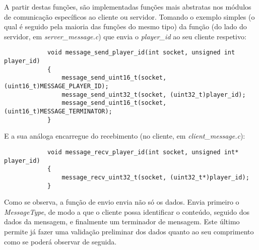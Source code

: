 \documentclass[a4paper]{report}
\begin{document}
        \par A partir destas funções, são implementadas funções mais abstratas nos módulos de comunicação específicos ao cliente ou servidor. Tomando o exemplo simples (o qual é seguido pela maioria das funções do mesmo tipo) da função (do lado do servidor, em \textit{server\_message.c}) que envia o \textit{player\_id} ao seu cliente respetivo:
        \begin{lstlisting}
            void message_send_player_id(int socket, unsigned int player_id)
            {
                message_send_uint16_t(socket, (uint16_t)MESSAGE_PLAYER_ID);
                message_send_uint32_t(socket, (uint32_t)player_id);
                message_send_uint16_t(socket, (uint16_t)MESSAGE_TERMINATOR);
            }
        \end{lstlisting}
        \par E a sua análoga encarregue do recebimento (no cliente, em \textit{client\_message.c}):
        \begin{lstlisting}
            void message_recv_player_id(int socket, unsigned int* player_id)
            {
                message_recv_uint32_t(socket, (uint32_t*)player_id);
            }
        \end{lstlisting}
        \par Como se observa, a função de envio envia não só os dados. Envia primeiro o \textit{MessageType}, de modo a que o cliente possa identificar o conteúdo, seguido dos dados da mensagem, e finalmente um terminador de mensagem. Este último permite já fazer uma validação preliminar dos dados quanto ao seu comprimento como se poderá observar de seguida.
        
\end{document}
